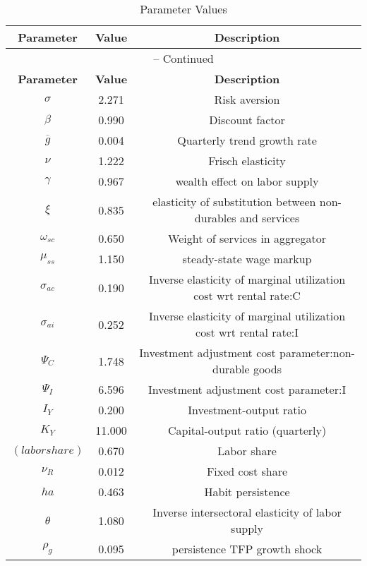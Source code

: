\begin{center}
\begin{longtable}{ccc}
\caption{Parameter Values}\\%
\toprule%
\multicolumn{1}{c}{\textbf{Parameter}} &
\multicolumn{1}{c}{\textbf{Value}} &
 \multicolumn{1}{c}{\textbf{Description}}\\%
\midrule%
\endfirsthead
\multicolumn{3}{c}{{\tablename} \thetable{} -- Continued}\\%
\midrule%
\multicolumn{1}{c}{\textbf{Parameter}} &
\multicolumn{1}{c}{\textbf{Value}} &
  \multicolumn{1}{c}{\textbf{Description}}\\%
\midrule%
\endhead
${\sigma}$ 	 & 	 2.271 	 & 	 Risk aversion\\
${\beta}$ 	 & 	 0.990 	 & 	 Discount factor\\
${\overline{g}}$ 	 & 	 0.004 	 & 	 Quarterly trend growth rate\\
$\nu$ 	 & 	 1.222 	 & 	 Frisch elasticity\\
$\gamma$ 	 & 	 0.967 	 & 	 wealth effect on labor supply\\
$\xi$ 	 & 	 0.835 	 & 	 elasticity of substitution between non-durables and services\\
$\omega_{sc}$ 	 & 	 0.650 	 & 	 Weight of services in aggregator\\
$\mu_{ss}$ 	 & 	 1.150 	 & 	 steady-state wage markup\\
${\sigma_{ac}}$ 	 & 	 0.190 	 & 	 Inverse elasticity of marginal utilization cost wrt rental rate:C\\
${\sigma_{ai}}$ 	 & 	 0.252 	 & 	 Inverse elasticity of marginal utilization cost wrt rental rate:I\\
${\Psi_{C}}$ 	 & 	 1.748 	 & 	 Investment adjustment cost parameter:non-durable goods\\
${\Psi_I}$ 	 & 	 6.596 	 & 	 Investment adjustment cost parameter:I\\
${I_Y}$ 	 & 	 0.200 	 & 	 Investment-output ratio\\
${K_Y}$ 	 & 	 11.000 	 & 	 Capital-output ratio (quarterly)\\
$(labor share)$ 	 & 	 0.670 	 & 	 Labor share\\
${\nu_R}$ 	 & 	 0.012 	 & 	 Fixed cost share\\
${ha}$ 	 & 	 0.463 	 & 	 Habit persistence\\
${\theta}$ 	 & 	 1.080 	 & 	 Inverse intersectoral elasticity of labor supply\\
${\rho_g}$ 	 & 	 0.095 	 & 	 persistence TFP growth shock\\

\end{longtable}
\end{center}
